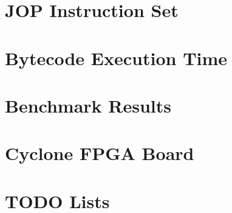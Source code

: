 \chapter{JOP Instruction Set} \label{appx:jop:instr}


\chapter{Bytecode Execution Time} \label{appx:bytecode}


\chapter{Benchmark Results} \label{appx:bench}


\chapter{Cyclone FPGA Board} \label{appx:cycore}


%




\printindex

\chapter{TODO Lists}




